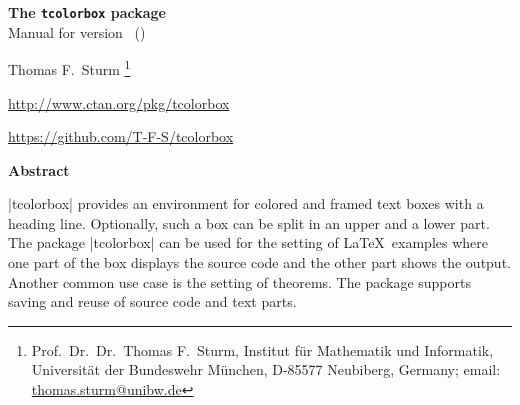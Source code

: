 \tcbuselistingtext
{}


\clearpage
\begin{center}
\begin{tcolorbox}[enhanced,hbox,tikznode,left=8mm,right=8mm,boxrule=0.4pt,
  colback=white,colframe=black!50!yellow,
  drop lifted shadow=black!50!yellow,arc is angular,
  before=\par\vspace*{5mm},after=\par\bigskip]
{\bfseries\LARGE The \texttt{tcolorbox} package}\\[3mm]
{\large Manual for version \version\ (\datum)}
\end{tcolorbox}
{\large Thomas F.~Sturm%
  \footnote{Prof.~Dr.~Dr.~Thomas F.~Sturm, Institut f\"{u}r Mathematik und Informatik,
    Universit\"{a}t der Bundeswehr M\"{u}nchen, D-85577 Neubiberg, Germany;
     email: \href{mailto:thomas.sturm@unibw.de}{thomas.sturm@unibw.de}}\par\medskip
\normalsize\url{http://www.ctan.org/pkg/tcolorbox}\par
\url{https://github.com/T-F-S/tcolorbox}}
\end{center}
\bigskip
\begin{absquote}
  \begin{center}\bfseries Abstract\end{center}
  |tcolorbox| provides an environment for colored and framed text boxes with a
  heading line. Optionally, such a box can be split in an upper and a lower
  part. The package |tcolorbox| can be used for the setting of \LaTeX\ examples where
  one part of the box displays the source code and the other part shows the
  output. Another common use case is the setting of theorems. The package supports
  saving and reuse of source code and text parts.
\end{absquote}

